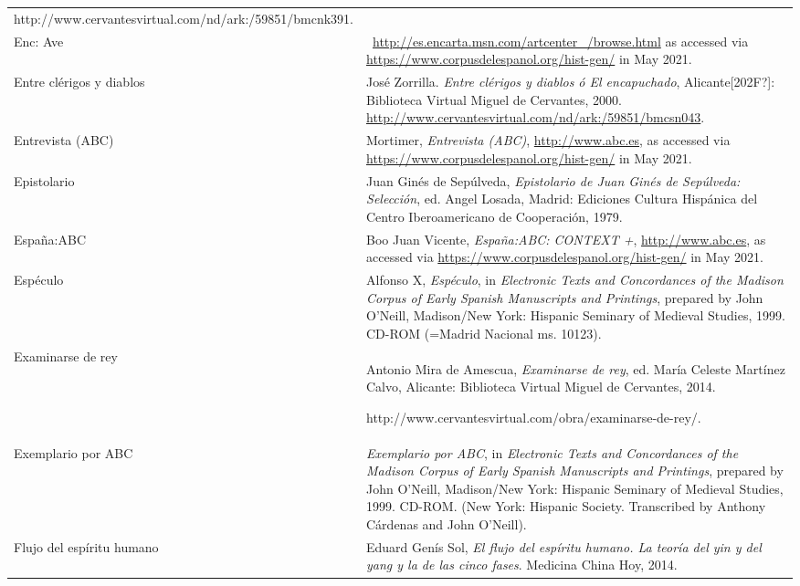 \documentclass[10pt]{article}
\begin{document}
\begin{flushleft}
\begin{supertabular}{m{1.7955599in}m{4.42126in}}
http://www.cervantesvirtual.com/nd/ark:/59851/bmcnk391.\\
Enc: Ave\textit{ } &
\ \url{http://es.encarta.msn.com/artcenter_/browse.html} as accessed via \url{https://www.corpusdelespanol.org/hist-gen/} in May 2021.\\
Entre clérigos y diablos  &
José Zorrilla. \textit{Entre clérigos y diablos ó El encapuchado}, Alicante[202F?]: Biblioteca Virtual Miguel de Cervantes, 2000. \url{http://www.cervantesvirtual.com/nd/ark:/59851/bmcsn043}.\\
Entrevista (ABC) &
Mortimer,\textit{ Entrevista (ABC)}, \url{http://www.abc.es}, as accessed via \url{https://www.corpusdelespanol.org/hist-gen/} in May 2021.\\
Epistolario  &
Juan Ginés de Sepúlveda, \textit{Epistolario de Juan Ginés de Sepúlveda: Selección}, ed. Angel Losada, Madrid: Ediciones Cultura Hispánica del Centro Iberoamericano de Cooperación, 1979.\\
España:ABC  &
Boo Juan Vicente,\textit{ España:ABC: CONTEXT +}, \url{http://www.abc.es}, as accessed via \url{https://www.corpusdelespanol.org/hist-gen/} in May 2021.\\
Espéculo  &
Alfonso X, \textit{Espéculo}, in \textit{Electronic Texts and Concordances of the Madison Corpus of Early Spanish Manuscripts and Printings},\textit{ }prepared by John O’Neill, Madison/New York: Hispanic Seminary of Medieval Studies, 1999. CD-ROM (=Madrid Nacional ms. 10123).\\
Examinarse de rey  &
Antonio Mira de Amescua, \textit{Examinarse de rey}, ed. María Celeste Martínez Calvo, Alicante: Biblioteca Virtual Miguel de Cervantes, 2014. 

http://www.cervantesvirtual.com/obra/examinarse-de-rey/.\\
Exemplario por ABC\textit{ \ } &
\textit{Exemplario por ABC}, in \textit{Electronic Texts and Concordances of the Madison Corpus of Early Spanish Manuscripts and Printings},\textit{ }prepared by John O’Neill, Madison/New York: Hispanic Seminary of Medieval Studies, 1999. CD-ROM. (New York: Hispanic Society. Transcribed by Anthony Cárdenas and John O'Neill).\\
Flujo del espíritu humano  &
Eduard Genís Sol, \textit{El flujo del espíritu humano. La teoría del yin y del yang y la de las cinco fases}. Medicina China Hoy, 2014.


\end{supertabular}
\end{flushleft}
\end{document}
